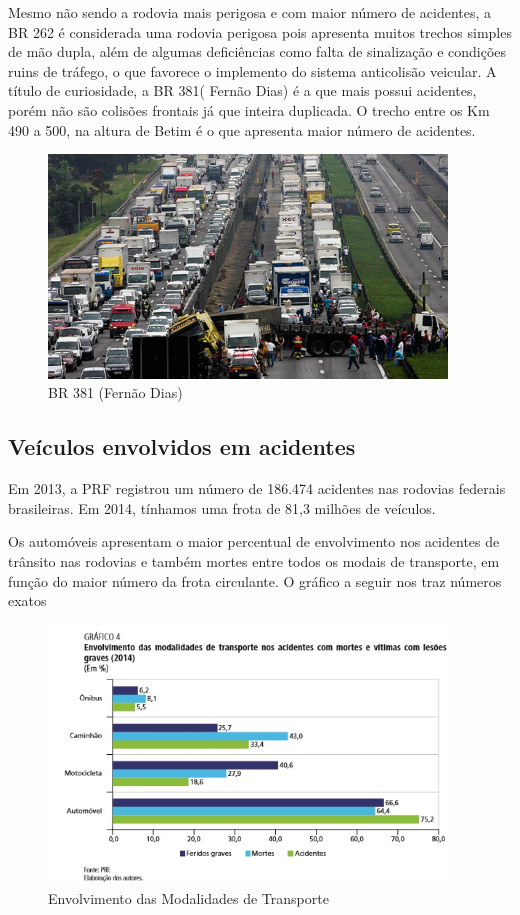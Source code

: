 Mesmo não sendo a rodovia mais perigosa e com maior número de acidentes, a BR 262
é considerada uma rodovia perigosa pois apresenta muitos trechos simples de mão
dupla, além de algumas deficiências como falta de sinalização e condições ruins
de tráfego, o que favorece o implemento do sistema anticolisão veicular. A título
de curiosidade, a BR 381( Fernão Dias) é a que mais possui acidentes, porém não
são colisões frontais já que inteira duplicada. O trecho entre os Km 490 a 500,
na altura de Betim é o que apresenta maior número de acidentes.

\begin{figure}[h]
  \centering
  \includegraphics[width=400px, scale=0.5]{figuras/br381}
  \caption{BR 381 (Fernão Dias)}
  \label{table:br381}
\end{figure}

\subsection{Veículos envolvidos em acidentes}
Em 2013, a PRF registrou um número de 186.474 acidentes nas rodovias federais
brasileiras. Em 2014, tínhamos uma frota de 81,3 milhões de veículos.

Os automóveis apresentam o maior percentual de envolvimento nos acidentes de
trânsito nas rodovias e também mortes entre todos os modais de transporte, em
função do maior número da frota circulante. O gráfico a seguir nos traz números
exatos

\begin{figure}[h]
  \centering
  \includegraphics[width=400px, scale=0.5]{figuras/niveisacidente}
  \caption{Envolvimento das Modalidades de Transporte \cite{ipea3}}
  \label{table:niveisacidente}
\end{figure}

